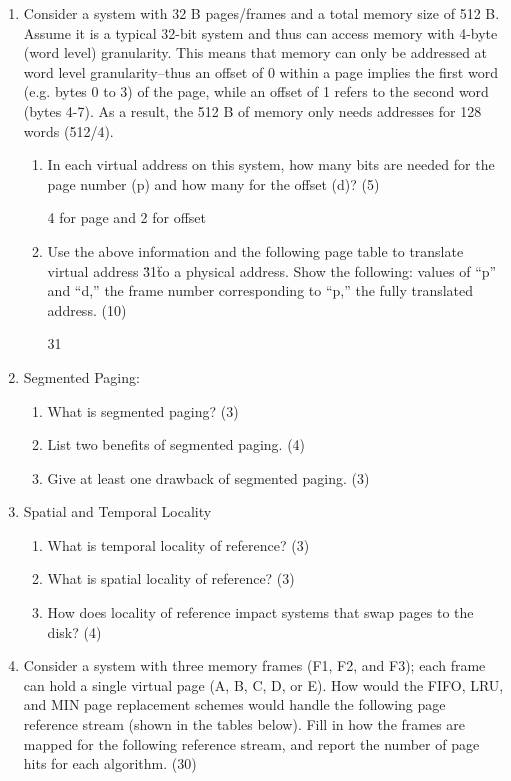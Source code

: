 \documentclass{article}
\begin{document}
\begin{enumerate}
\item Consider a system with 32 B pages/frames and a total memory size of 512 B. Assume it is a typical 32-bit system and thus can access memory with 4-byte (word level) granularity. This means that memory can only be addressed at word level granularity--thus an offset of 0 within a page implies the first word (e.g. bytes 0 to 3) of the page, while an offset of 1 refers to the second word (bytes 4-7). As a result, the 512 B of memory only needs addresses for 128 words (512/4).
\begin{enumerate}
\renewcommand{\theenumi}{\Alph{enumi}}
\item In each virtual address on this system, how many bits are needed for the page number (p) and how many for the offset (d)? (5) 

4 for page and 2 for offset

\item Use the above information and the following page table to translate virtual address \"31\" to a physical address. Show the following: values of “p” and “d,” the frame number corresponding to “p,” the fully translated address. (10) 

31
\end{enumerate}

\item Segmented Paging:
\begin{enumerate}
\renewcommand{\theenumi}{\Alph{enumi}}
\item What is segmented paging? (3) 
\item List two benefits of segmented paging. (4) 
\item Give at least one drawback of segmented paging. (3) 
\end{enumerate}



\item Spatial and Temporal Locality
\begin{enumerate}
\renewcommand{\theenumi}{\Alph{enumi}}
\item What is temporal locality of reference? (3)
\item What is spatial locality of reference? (3)
\item How does locality of reference impact systems that swap pages to the disk? (4)
\end{enumerate}



\item Consider a system with three memory frames (F1, F2, and F3); each frame can hold a single virtual page (A, B, C, D, or E). How would the FIFO, LRU, and MIN page replacement schemes would handle the following page reference stream (shown in the tables below). Fill in how the frames are mapped for the following reference stream, and report the number of page hits for each algorithm. (30)

\end{enumerate}
\end{document}
